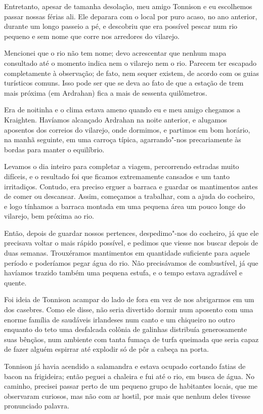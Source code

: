 Entretanto, apesar de tamanha desolação, meu amigo Tonnison e eu escolhemos passar nossas férias ali. Ele deparara
com o local por puro acaso, no ano anterior, durante um longo passeio a pé, e descobriu que era possível pescar num rio
pequeno e sem nome que corre nos arredores do vilarejo.

Mencionei que o rio não tem nome; devo acrescentar que nenhum mapa consultado até o momento indica nem o vilarejo nem
o rio. Parecem ter escapado completamente à observação; de fato, nem sequer existem, de acordo com os guias
turísticos comuns. Isso pode ser que se deva ao fato de que a estação de trem mais próxima (em Ardrahan) fica a mais de
sessenta quilômetros.

Era de noitinha e o clima estava ameno quando eu e meu amigo chegamos a Kraighten. Havíamos alcançado Ardrahan na noite
anterior, e alugamos aposentos dos correios do vilarejo, onde dormimos, e partimos em bom horário, na manhã seguinte,
em uma carroça típica, agarrando"-nos precariamente às bordas para manter o equilíbrio.

Levamos o dia inteiro para completar a viagem, percorrendo estradas muito difíceis, e o resultado foi que ficamos
extremamente cansados e um tanto irritadiços. Contudo, era preciso erguer a barraca e guardar os mantimentos antes de
comer ou descansar. Assim, começamos a trabalhar, com a ajuda do cocheiro, e logo tínhamos a barraca montada em uma
pequena área um pouco longe do vilarejo, bem próxima ao rio.

Então, depois de guardar nossos pertences, despedimo"-nos do cocheiro, já que ele precisava voltar o mais rápido
possível, e pedimos que viesse nos buscar depois de duas semanas. Trouxéramos mantimentos em quantidade suficiente para
aquele período e poderíamos pegar água do rio. Não precisávamos de combustível, já que havíamos trazido também uma
pequena estufa, e o tempo estava agradável e quente.

Foi ideia de Tonnison acampar do lado de fora em vez de nos abrigarmos em um dos casebres. Como ele disse, não seria
divertido dormir num aposento com uma enorme família de saudáveis irlandeses num canto e um chiqueiro no outro enquanto
do teto uma desfalcada colônia de galinhas distribuía generosamente suas bênçãos, num ambiente com tanta fumaça de
turfa queimada que seria capaz de fazer alguém espirrar até explodir só de pôr a cabeça na porta.

Tonnison já havia acendido a salamandra e estava ocupado cortando fatias de bacon na frigideira; então peguei a chaleira
e fui até o rio, em busca de água. No caminho, precisei passar perto de um pequeno grupo de habitantes locais, que me
observaram curiosos, mas não com ar hostil, por mais que nenhum deles tivesse pronunciado palavra.

